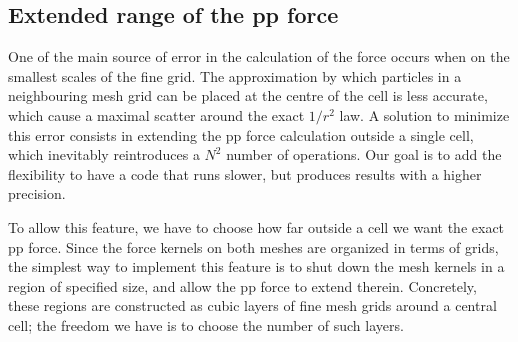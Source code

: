 \subsection{Extended range of the pp force}
\label{subsec:extendedpp}

One of the main source of error in the calculation of the force occurs when on the smallest scales of the fine grid.
The approximation by which particles in a neighbouring mesh grid can be placed at the centre of the cell
is less accurate, which cause a maximal scatter around the exact $1/r^2$ law.
A solution to minimize this error consists in extending the pp force calculation outside a single cell,
which inevitably reintroduces a $N^2$ number of operations. Our goal is to add the flexibility to have a code
that runs slower, but produces results with a higher precision. 

To allow this feature, we  have to choose how far outside a cell we want the exact pp force.  
Since the force kernels on both meshes are organized in terms of grids, the simplest way to implement this 
feature is to shut down the mesh kernels in a region of specified size, and allow the pp force to extend therein.
Concretely, these regions are constructed as cubic layers of fine mesh grids around a central cell; 
the freedom we have is to choose the number of such layers.
 
